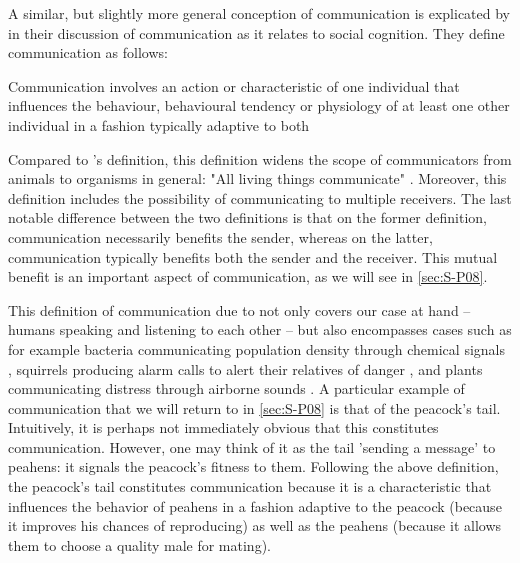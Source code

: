 
A similar, but slightly more general conception of communication is explicated by \citet{Freeberg19} in their discussion of communication as it relates to social cognition. They define communication as follows:
\begin{quoting}
    Communication involves an action or characteristic of one individual that influences the behaviour, behavioural tendency or physiology of at least one other individual in a fashion typically adaptive to both
\end{quoting}
Compared to \citeauthor{DawkinsKrebs78}'s definition, this definition widens the scope of communicators from animals to organisms in general: "All living things communicate" \citep[p.~281]{Freeberg19}.
Moreover, this definition includes the possibility of communicating to multiple receivers. The last notable difference between the two definitions is that on the former definition, communication necessarily benefits the sender, whereas on the latter, communication typically benefits both the sender and the receiver. This mutual benefit is an important aspect of communication, as we will see in \cref{sec:S-P08}.

This definition of communication due to \citet{Freeberg19} not only covers our case at hand -- humans speaking and listening to each other -- but also encompasses cases such as for example bacteria communicating population density through chemical signals \citep{Federle03}, squirrels producing alarm calls to alert their relatives of danger \citep{Sherman77}, and plants communicating distress through airborne sounds \citep{Khait23}.
A particular example of communication that we will return to in \cref{sec:S-P08} is that of the peacock's tail. Intuitively, it is perhaps not immediately obvious that this constitutes communication. However, one may think of it as the tail 'sending a message' to peahens: it signals the peacock's fitness to them.
Following the above definition, the peacock's tail constitutes communication because it is a characteristic that influences the behavior of peahens in a fashion adaptive to the peacock (because it improves his chances of reproducing) as well as the peahens (because it allows them to choose a quality male for mating).

